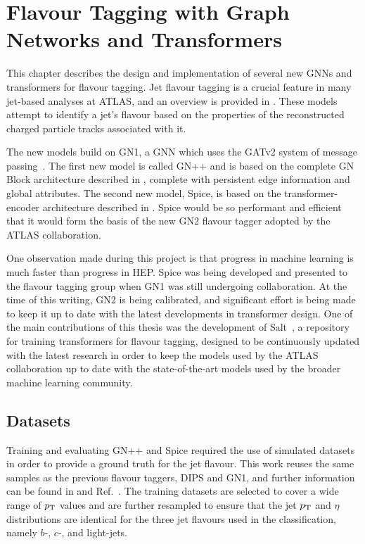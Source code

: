 
\chapter{Flavour Tagging with Graph Networks and Transformers}
\label{ch:spice}

This chapter describes the design and implementation of several new GNNs and transformers for flavour tagging.
Jet flavour tagging is a crucial feature in many jet-based analyses at ATLAS, and an overview is provided in .
These models attempt to identify a jet's flavour based on the properties of the reconstructed charged particle tracks associated with it.

The new models build on GN1, a GNN which uses the GATv2 system of message passing~\cite{GATv2}.
The first new model is called GN++ and is based on the complete GN Block architecture described in , complete with persistent edge information and global attributes.
The second new model, Spice, is based on the transformer-encoder architecture described in .
Spice would be so performant and efficient that it would form the basis of the new GN2 flavour tagger adopted by the ATLAS collaboration.

One observation made during this project is that progress in machine learning is much faster than progress in HEP.
Spice was being developed and presented to the flavour tagging group when GN1 was still undergoing collaboration.
At the time of this writing, GN2 is being calibrated, and significant effort is being made to keep it up to date with the latest developments in transformer design.
One of the main contributions of this thesis was the development of Salt~\cite{Salt}, a repository for training transformers for flavour tagging, designed to be continuously updated with the latest research in order to keep the models used by the ATLAS collaboration up to date with the state-of-the-art models used by the broader machine learning community.

\section{Datasets}

Training and evaluating GN++ and Spice required the use of simulated datasets in order to provide a ground truth for the jet flavour.
This work reuses the same samples as the previous flavour taggers, DIPS and GN1, and further information can be found in \textcite{AlexThesis} and Ref.~\cite{GN1}.
The training datasets are selected to cover a wide range of $p_{\text{T}}$ values and are further resampled to ensure that the jet $p_{\text{T}}$ and $\eta$ distributions are identical for the three jet flavours used in the classification, namely $b$-, $c$-, and light-jets.

